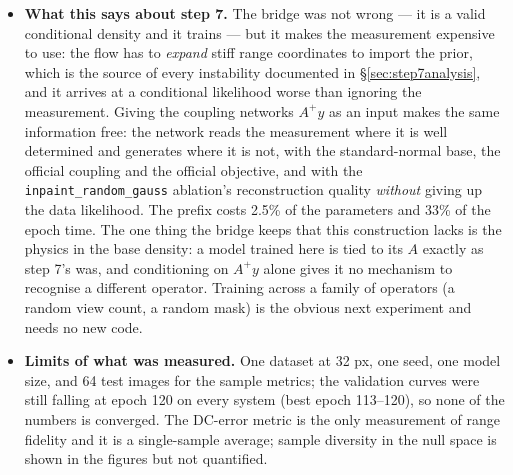 \documentclass[11pt]{article}
\begin{document}
\begin{itemize}
{        (claim vi).} \texttt{sr\_4x\_unbounded} --- the official coupling
        head, otherwise identical --- reached 1.097 bits/dim against 1.104
        with the bound (a 0.007 difference on one seed; its validation
        curve sits on top of the bounded one throughout), with the same
        rejected-batch count (1), the same failure count (1 in 10000), and
        PSNR and data consistency equal within 0.1 dB and 0.001. But 2 of
        the 64 test images produced a non-finite posterior sample in one of
        four draws, where the bounded head produced none in $6 \times 256$
        draws across the six systems; the sample and mean PSNR of the
        unbounded run (17.7 and 19.9 dB) are computed on the 62 images that
        stayed finite. On an untrained model the same head gave 60 of 64
        non-finite samples (Methods). So the overflow in the sampling
        direction is real, it is rare on a trained model, and it is
        removed by a $\tanh$ at zero cost in likelihood. The bound stays on
        by default; the table keeps both rows.
  \item \textbf{What this says about step 7.} The bridge was not wrong ---
        it is a valid conditional density and it trains --- but it makes
        the measurement expensive to use: the flow has to \emph{expand}
        stiff range coordinates to import the prior, which is the source of
        every instability documented in \S\ref{sec:step7analysis}, and it
        arrives at a conditional likelihood worse than ignoring the
        measurement. Giving the coupling networks $A^{+}y$ as an input
        makes the same information free: the network reads the measurement
        where it is well determined and generates where it is not, with the
        standard-normal base, the official coupling and the official
        objective, and with the \texttt{inpaint\_random\_gauss} ablation's
        reconstruction quality \emph{without} giving up the data likelihood.
        The prefix costs 2.5\% of the parameters and 33\% of the epoch time.
        The one thing the bridge keeps that this construction lacks is the
        physics in the base density: a model trained here is tied to its
        $A$ exactly as step 7's was, and conditioning on $A^{+}y$ alone
        gives it no mechanism to recognise a different operator. Training
        across a family of operators (a random view count, a random mask)
        is the obvious next experiment and needs no new code.
  \item \textbf{Limits of what was measured.} One dataset at 32 px, one
        seed, one model size, and 64 test images for the sample metrics;
        the validation curves were still falling at epoch 120 on every
        system (best epoch 113--120), so none of the numbers is converged.
        The DC-error metric is the only measurement of range fidelity and it
        is a single-sample average; sample diversity in the null space is
        shown in the figures but not quantified.
\end{itemize}
\end{document}
